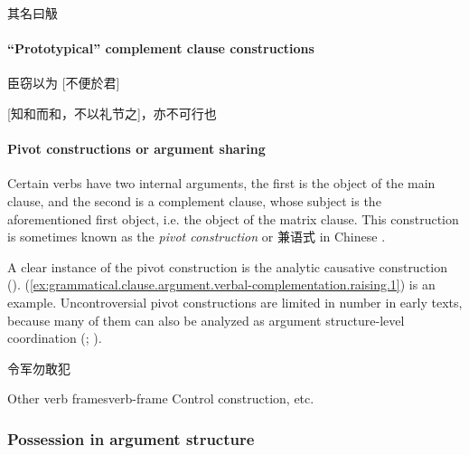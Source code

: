 \documentclass[UTF8, a4paper, oneside, scheme=plain, 12pt]{ctexrep}
\newcommand*{\citepage}[1]{p.~{#1}}
\newcommand*{\term}[1]{\emph{#1}}
\begin{document}
\begin{exe}
    \ex\label{ex:grammatical.clause.argument.verbal-complementation.direct-quotation.nominal-say.1} 其名曰觙
\end{exe}

\paragraph{``Prototypical'' complement clause constructions}

\begin{exe}
    \ex 臣窃以为 [不便於君]
\end{exe}

\begin{exe}
    \ex {} [知和而和，不以礼节之]，亦不可行也
\end{exe}

\paragraph{Pivot constructions or argument sharing}

Certain verbs have two internal arguments,
the first is the object of the main clause,
and the second is a complement clause, whose subject is the aforementioned first object,
i.e. the object of the matrix clause.
This construction is sometimes known as the \term{pivot construction} \citep[\citepage{40}]{pulleyblank1995outline} or 兼语式 in Chinese \citep[\citepage{375}]{meiguang2018}.

A clear instance of the pivot construction is the analytic causative construction ().
(\ref{ex:grammatical.clause.argument.verbal-complementation.raising.1}) is an example.
Uncontroversial pivot constructions are limited in number in early texts,
because many of them can also be analyzed as argument structure-level coordination
(\citealt[\citepage{376}]{meiguang2018}; ).

\begin{exe}
    \ex\label{ex:grammatical.clause.argument.verbal-complementation.raising.1} 令军勿敢犯
\end{exe}

\begin{todobox}{Other verb frames}{verb-frame}
    Control construction, etc.
\end{todobox}

\subsubsection{Possession in argument structure}
\end{document}
